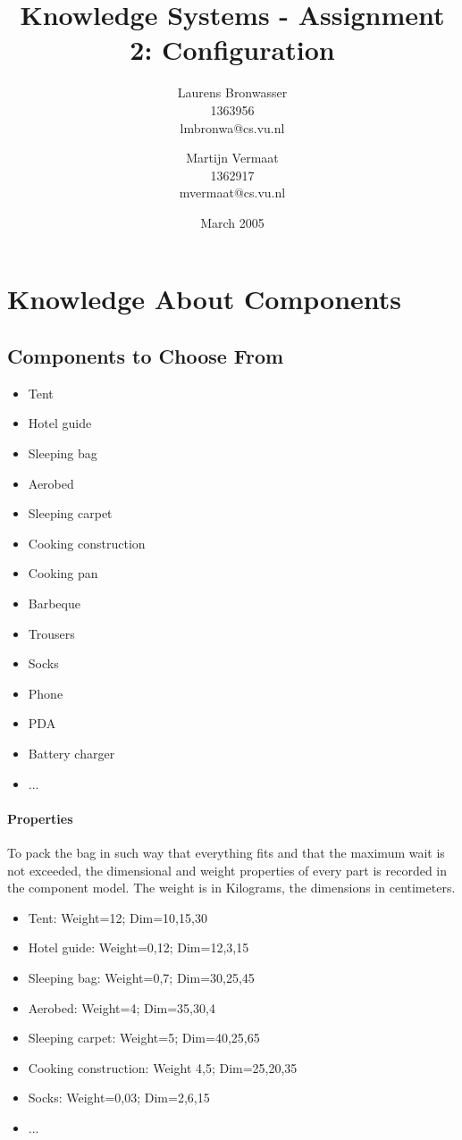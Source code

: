 \documentclass[a4paper,11pt]{article}
\title{Knowledge Systems - Assignment 2: Configuration}
\author{Laurens Bronwasser\\
1363956\\
lmbronwa@cs.vu.nl
\and
Martijn Vermaat\\
1362917\\
mvermaat@cs.vu.nl}
\date{March 2005}
\begin{document}
\maketitle




\tableofcontents


\section{Knowledge About Components}


\subsection*{Components to Choose From}

\begin{itemize}
\item Tent 
\item Hotel guide 
\item Sleeping bag 
\item Aerobed 
\item Sleeping carpet 
\item Cooking construction
\item Cooking pan
\item Barbeque
\item Trousers
\item Socks
\item Phone
\item PDA
\item Battery charger
\item ...
\end{itemize}

\paragraph{Properties}

To pack the bag in such way that everything fits and that the maximum wait is 
not exceeded, the dimensional and weight properties of every part is recorded in
the component model. The weight is in Kilograms, the dimensions in centimeters.

\begin{itemize}
\item Tent: Weight=12; Dim=10,15,30
\item Hotel guide: Weight=0,12; Dim=12,3,15
\item Sleeping bag: Weight=0,7; Dim=30,25,45
\item Aerobed: Weight=4; Dim=35,30,4
\item Sleeping carpet: Weight=5; Dim=40,25,65
\item Cooking construction: Weight 4,5; Dim=25,20,35
\item Socks: Weight=0,03; Dim=2,6,15
\item ...
\end{itemize}
\end{document}
